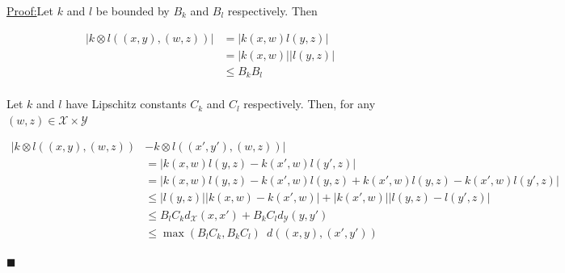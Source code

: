 \documentclass[]{article}
\newenvironment{claimproof}[1]{\par\noindent\underline{Proof:}\space#1}{\hfill $\blacksquare$}
\begin{document}
\begin{claimproof} Let $k$ and $l$ be bounded by $B_k$ and $B_l$ respectively. Then 

\begin{align*}
|k \otimes l \left( (x,y), (w,z) \right)| &= |k(x,w)l(y,z)| \\
&= |k(x,w)||l(y,z)| \\
&\leq B_k B_l \\
\end{align*}

Let $k$ and $l$ have Lipschitz constants $C_k$ and $C_l$ respectively. Then, for any $(w,z) \in \mathcal{X\times Y}$

\begin{align*}
|k \otimes l \left( (x,y), (w,z) \right) &- k \otimes l \left( (x',y'), (w,z) \right) |  \\
& = |k(x,w)l(y,z) - k(x',w)l(y',z)| \\
& = |k(x,w)l(y,z) - k(x',w)l(y,z) + k(x',w)l(y,z) - k(x',w)l(y',z)| \\
& \leq |l(y,z)| |k(x,w) - k(x',w)| + |k(x',w)||l(y,z) - l(y',z)| \\
& \leq B_l C_k d_\mathcal{X}(x,x') + B_k C_l d_\mathcal{Y}(y,y') \\
& \leq \max(B_l C_k, B_k C_l )  \enspace d\left((x,y),(x',y')\right) 
\end{align*}

\end{claimproof}
\end{document}
